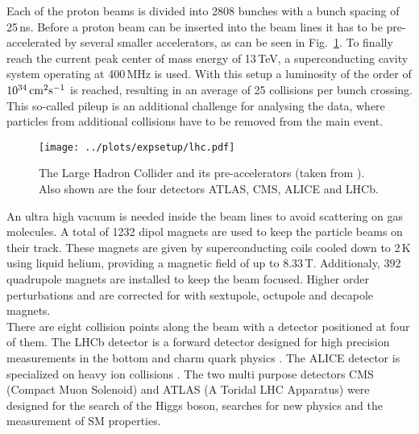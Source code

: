 \noindent Each of the proton beams is divided into 2808 bunches with a bunch spacing of 25\,ns. Before a proton beam can be inserted into the beam lines it has to be pre-accelerated by several smaller accelerators, as can be seen in Fig.~\ref{fig:expsetup:lhc}. To finally reach the current peak center of mass energy of 13\,TeV, a superconducting cavity system operating at 400\,MHz is used. With this setup a luminosity of the order of $10^{34}\,\rm{cm}^2\rm{s}^{-1}$ is reached, resulting in an average of 25 collisions per bunch crossing. This so-called pileup is an additional challenge for analysing the data, where particles from additional collisions have to be removed from the main event.\\
\begin{figure}[t]
	\centering
	\texttt{[image: ../plots/expsetup/lhc.pdf]}
	\caption[The Large Hadron Collider]{The Large Hadron Collider and its pre-accelerators (taken from \cite{lhc_fig}). Also shown are the four detectors ATLAS, CMS, ALICE and LHCb.}
	\label{fig:expsetup:lhc}
\end{figure}

\noindent An ultra high vacuum is needed inside the beam lines to avoid scattering on gas molecules. A total of 1232 dipol magnets are used to keep the particle beams on their track. These magnets are given by superconducting coils cooled down to 2\,K using liquid helium, providing a magnetic field of up to 8.33\,T. Additionaly, 392 quadrupole magnets are installed to keep the beam focused. Higher order perturbations and are corrected for with sextupole, octupole and decapole magnets.\\

\noindent There are eight collision points along the beam with a detector positioned at four of them. The LHCb detector is a forward detector designed for high precision measurements in the bottom and charm quark physics \cite{LHCB}. The ALICE detector is specialized on heavy ion collisions \cite{ALICE}. The two multi purpose detectors CMS (Compact Muon Solenoid) and ATLAS (A Toridal LHC Apparatus) were designed for the search of the Higgs boson, searches for new physics and the measurement of SM properties.\\


